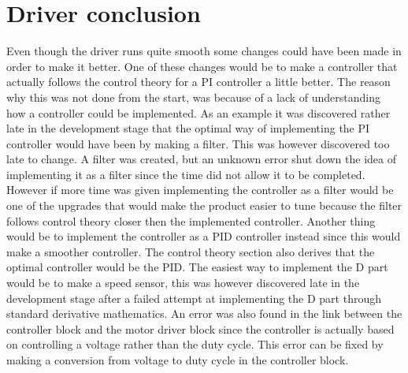 \section{Driver conclusion}

Even though the driver runs quite smooth some changes could have been made in order to make it better. One of these changes would be to make a controller that actually follows the control theory for a PI controller a little better. The reason why this was not done from the start, was because of a lack of understanding how a controller could be implemented. As an example it was discovered rather late in the development stage that the optimal way of implementing the PI controller would have been by making a filter. This was however discovered too late to change. A filter was created, but an unknown error shut down the idea of implementing it as a filter since the time did not allow it to be completed. However if more time was given implementing the controller as a filter would be one of the upgrades that would make the product easier to tune because the filter follows control theory closer then the implemented controller.
Another thing would be to implement the controller as a PID controller instead since this would make a smoother controller. The control theory section also derives that the optimal controller would be the PID. The easiest way to implement the D part would be to make a speed sensor, this was however discovered late in the development stage after a failed attempt at implementing the D part through standard derivative mathematics.
An error was also found in the link between the controller block and the motor driver block since the controller is actually based on controlling a voltage rather than the duty cycle. This  error can be fixed by making a conversion from voltage to duty cycle in the controller block.
